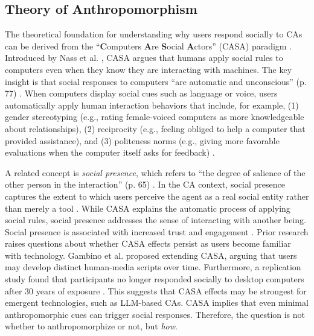 \documentclass[manuscript,anonymous,sigconf]{acmart}
\begin{document}
\subsection{Theory of Anthropomorphism}


The theoretical foundation for understanding why users respond socially to CAs can be derived from the ``\textbf{C}omputers \textbf{A}re \textbf{S}ocial \textbf{A}ctors'' (CASA) paradigm \cite{nass2000researching}. Introduced by Nass et al. \cite{nass1994computers}, CASA argues that humans apply social rules to computers even when they know they are interacting with machines. The key insight is that social responses to computers ``are automatic and
unconscious'' (p. 77) \citep{nass1994computers}. When computers display social cues such as language or voice, users automatically apply human interaction behaviors that include, for example, (1) gender stereotyping (e.g., rating female-voiced computers as more knowledgeable about relationships), (2) reciprocity (e.g., feeling obliged to help a computer that provided assistance), and (3) politeness norms (e.g., giving more favorable evaluations when the computer itself asks for feedback) \citep{nass1997machines}. 

A related concept is \textit{social presence}, which refers to ``the degree of salience of the other person in the interaction'' (p. 65) \citep{short1976social}. In the CA context, social presence captures the extent to which users perceive the agent as a real social entity rather than merely a tool \citep{oh2018systematic}. While CASA explains the automatic process of applying social rules, social presence addresses the sense of interacting with another being. Social presence is associated with increased trust and engagement \citep{gunawardena1995social}. Prior research raises questions about whether CASA effects persist as users become familiar with technology. Gambino et al. \cite{gambino2020building} proposed extending CASA, arguing that users may develop distinct human-media scripts over time. Furthermore, a replication study found that participants no longer responded socially to desktop computers after 30 years of exposure \citep{koger2023casa}. This suggests that CASA effects may be strongest for emergent technologies, such as LLM-based CAs. CASA implies that even minimal anthropomorphic cues can trigger social responses. Therefore, the question is not whether to anthropomorphize or not, but \textit{how}.  %
\end{document}
